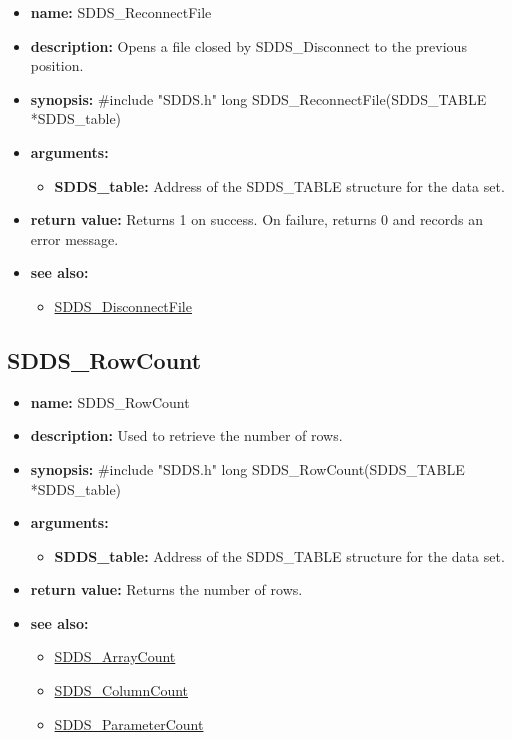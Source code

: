 \documentclass[11pt]{article}
\newcommand{\progref}[1]{\hyperref{SDDS_#1}{{\tt SDDS\_#1} (}{)}{SDDS_#1}}
\begin{document}
\begin{itemize}
\item {\bf name:}\newline
SDDS\_ReconnectFile
\item {\bf description:}\newline
Opens a file closed by SDDS\_Disconnect to the previous position.
\item {\bf synopsis:} \#include "SDDS.h"\newline
long SDDS\_ReconnectFile(SDDS\_TABLE *SDDS\_table)
\item {\bf arguments:}
\begin{itemize}
\item {\bf SDDS\_table:} Address of the SDDS\_TABLE structure for the data set.
\end{itemize}
\item {\bf return value:}\newline
Returns 1 on success. On failure, returns 0 and records an error message.
\item {\bf see also:}
\begin{itemize}
\item \progref{DisconnectFile}
\end{itemize}
\end{itemize}

\subsection{SDDS\_RowCount}
\label{SDDS_RowCount}

\begin{itemize}
\item {\bf name:}\newline
SDDS\_RowCount
\item {\bf description:}\newline
Used to retrieve the number of rows.
\item {\bf synopsis:} \#include "SDDS.h"\newline
long SDDS\_RowCount(SDDS\_TABLE *SDDS\_table)
\item {\bf arguments:}
\begin{itemize}
\item {\bf SDDS\_table:} Address of the SDDS\_TABLE structure for the data set.
\end{itemize}
\item {\bf return value:}\newline
Returns the number of rows.
\item {\bf see also:}
\begin{itemize}
\item \progref{ArrayCount}
\item \progref{ColumnCount}
\item \progref{ParameterCount}
\end{itemize}
\end{itemize}
\end{document}
